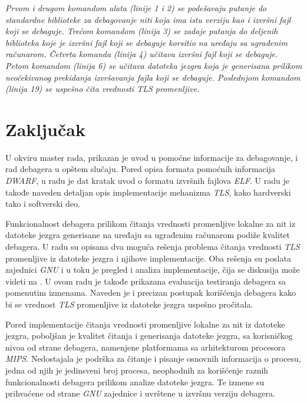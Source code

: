 \documentclass[12pt,oneside]{memoir}
\begin{document}
\emph{Prvom i drugom komandom alata (linije 1 i 2) se podešavaju putanje do standardne biblioteke za debagovanje niti koja ima istu verziju kao i izvršni fajl koji se debaguje. Trećom komandom (linija 3) se zadaje putanja do deljenih biblioteka koje je izvršni fajl koji se debaguje korsitio na uređaju sa ugrađenim računarom. Četvrta komanda (linija 4) učitava izvršni fajl koji se debaguje. Petom komandom (linija 6) se učitava datoteka jezgra koja je generisana prilikom neočekivanog prekidanja izvršavanja fajla koji se debaguje. Poslednjom komandom (linija 19) se uspešno čita vrednosti \emph{TLS} promenljive.}

\chapter{Zaključak}

U okviru master rada, prikazan je uvod u pomoćne informacije za debagovanje, i rad debagera u opštem slučaju. Pored opisa formata pomoćnih informacija \emph{DWARF}, u radu je dat kratak uvod o formatu izvršnih fajlova \emph{ELF}. U radu je takođe naveden detaljan opis implementacije mehanizma \emph{TLS}, kako hardverski tako i softverski deo.

Funkcionalnost debagera prilikom čitanja vrednosti promenljive lokalne za nit iz datoteke jezgra generisane na uređaju sa ugrađenim računarom podiže kvalitet debagera. U radu su opisana dva moguća rešenja problema čitanja vrednosti \emph{TLS} promenljive iz datoteke jezgra i njihove implementacije. Oba rešenja su poslata zajednici \emph{GNU} i u toku je pregled i analiza implementacije, čija se diskusija može videti na \cite{TLSPatch}. U ovom radu je takođe prikazana evaluacija testiranja debagera sa pomenutim izmenama. Naveden je i precizan postupak korišćenja debagera kako bi se vrednost \emph{TLS} promenljive iz datoteke jezgra uspešno pročitala.

Pored implementacije čitanja vrednosti promenljive lokalne za nit iz datoteke jezgra, poboljšan je kvalitet čitanja i generisanja datoteke jezgra, sa korisničkog nivoa od strane debagera, namenjene platformama sa arhitekturom procesora \emph{MIPS}. Nedostajala je podrška za čitanje i pisanje osnovnih informacija o procesu, jedna od njih je jedinsveni broj procesa, neophodnih za korišćenje raznih funkcionalnosti debagera prilikom analize datoteke jezgra. Te izmene su prihvaćene od strane \emph{GNU} zajednice i uvrštene u izvršnu verziju debagera.
\end{document}
